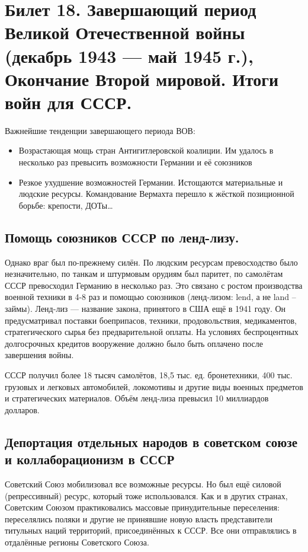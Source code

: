 \section{Билет 18. Завершающий период Великой Отечественной войны (декабрь 1943 — май 1945 г.), Окончание Второй мировой. Итоги войн для СССР.}


Важнейшие тенденции завершающего периода ВОВ:
\begin{itemize}
    \item Возрастающая мощь стран Антигитлеровской коалиции. Им удалось в несколько раз превысить возможности Германии и её союзников
    \item Резкое ухудшение возможностей Германии. Истощаются материальные и людские ресурсы. Командование Вермахта перешло к жёсткой позиционной борьбе: крепости, ДОТы\dots
\end{itemize}

\subsection{Помощь союзников СССР по ленд-лизу.}

Однако враг был по-прежнему силён. По людским ресурсам превосходство было незначительно, по танкам и штурмовым орудиям был паритет, по самолётам СССР превосходил Германию в несколько раз. Это связано с ростом производства военной техники в 4-8 раз и помощью союзников (ленд-лизом: lend, а не land -- займы). Ленд-лиз --- название закона, принятого в США ещё в 1941 году. Он предусматривал поставки боеприпасов, техники, продовольствия, медикаментов, стратегического сырья без предварительной оплаты. На условиях беспроцентных долгосрочных кредитов вооружение должно было быть оплачено после завершения войны.

СССР получил более 18 тысяч самолётов, 18,5 тыс. ед. бронетехники, 400 тыс. грузовых и легковых автомобилей, локомотивы и другие виды военных предметов и стратегических материалов. Объём ленд-лиза превысил 10 миллиардов долларов.

\subsection{Депортация отдельных народов в советском союзе и коллаборационизм в СССР}

Советский Союз мобилизовал все возможные ресурсы. Но был ещё силовой (репрессивный) ресурс, который тоже использовался. Как и в других странах, Советским Союзом практиковались массовые принудительные переселения: переселялись поляки и другие не принявшие новую власть представители титульных наций территорий, присоединённых к СССР. Все они отправлялись в отдалённые регионы Советского Союза.

